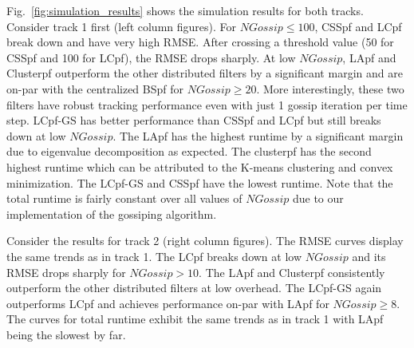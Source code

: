 \documentclass[10pt,letterpaper,final]{article}
\begin{document}
Fig.~\ref{fig:simulation_results} shows the simulation results for both tracks. Consider track 1 first (left column figures). For $NGossip\leq 100$, CSSpf and LCpf break down and have very high RMSE. After crossing a threshold value (50 for CSSpf and 100 for LCpf), the RMSE drops sharply. At low $NGossip$, LApf and Clusterpf outperform the other distributed filters by a significant margin and are on-par with the centralized BSpf for $NGossip\geq 20$. More interestingly, these two filters have robust tracking performance even with just 1 gossip iteration per time step. LCpf-GS has better performance than CSSpf and LCpf but still breaks down at low $NGossip$. The LApf has the highest runtime by a significant margin due to eigenvalue decomposition as expected. The clusterpf has the second highest runtime which can be attributed to the K-means clustering and convex minimization. The LCpf-GS and CSSpf have the lowest runtime. Note that the total runtime is fairly constant over all values of $NGossip$ due to our implementation of the gossiping algorithm. 

Consider the results for track 2 (right column figures). The RMSE curves display the same trends as in track 1. The LCpf breaks down at low $NGossip$ and its RMSE drops sharply for $NGossip>10$. The LApf and Clusterpf consistently outperform the other distributed filters at low overhead. The LCpf-GS again outperforms LCpf and achieves performance on-par with LApf for $NGossip\geq 8$. The curves for total runtime exhibit the same trends as in track 1 with LApf being the slowest by far. 
\end{document}
